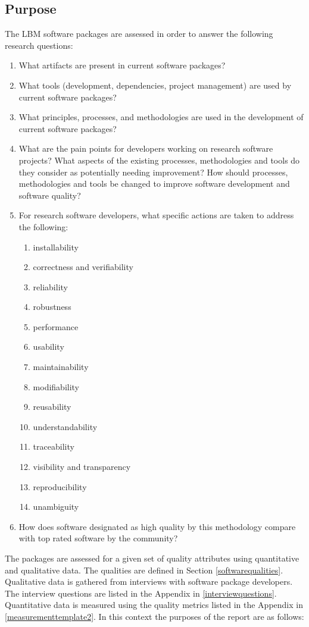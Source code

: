 \documentclass[12pt, notitlepage]{article}
\begin{document}
\subsection{Purpose}\label{purpose}

The LBM software packages are assessed in order to answer the following research questions:

\begin{enumerate}
	\item What artifacts are present in current software packages? 
	\item What tools (development, dependencies, project management) are used by current software packages?
	\item What principles, processes, and methodologies are used in the development
	of current software packages?
	\item What are the pain points for developers working on research software
	projects?  What aspects of the existing processes, methodologies and tools do
	they consider as potentially needing improvement?  How should processes,
	methodologies and tools be changed to improve software development and
	software quality?
	\item For research software developers, what specific actions are taken to
	address the following:
	\begin{enumerate}
		\item installability
		\item correctness and verifiability
		\item reliability
		\item robustness
		\item performance
		\item usability
		\item maintainability
		\item modifiability
		\item reusability
		\item understandability
		\item traceability
		\item visibility and transparency
		\item reproducibility
		\item unambiguity
	\end{enumerate} 
	\item How does software designated as high quality by this methodology compare	with top rated software by the community?
\end{enumerate}

The packages are assessed for a given set of quality attributes using quantitative and qualitative data. The qualities are defined in Section \ref{softwarequalities}. Qualitative data is gathered from interviews with software package developers. The interview questions are listed in the Appendix in \ref{interviewquestions}. Quantitative data is measured using the quality metrics listed in the Appendix in \ref{measurementtemplate2}. In this context the purposes of the report are as follows:
\end{document}
